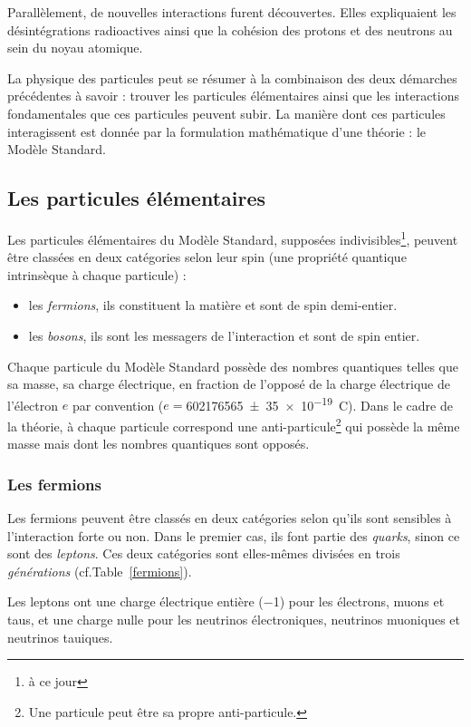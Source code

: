 \vspace*{-0.5cm}
Parallèlement, de nouvelles interactions furent découvertes. Elles expliquaient les désintégrations radioactives ainsi que la cohésion des protons et des neutrons au sein du noyau atomique.

La physique des particules peut se résumer à la combinaison des deux démarches précédentes à savoir : trouver les particules élémentaires ainsi que les interactions fondamentales que ces particules peuvent subir. La manière dont ces particules interagissent est donnée par la formulation mathématique d'une théorie : le Modèle Standard.

\subsection{Les particules élémentaires}
Les particules élémentaires du Modèle Standard, supposées indivisibles\footnote{à ce jour}, peuvent être classées en deux catégories selon leur spin (une propriété quantique intrinsèque à chaque particule) :
\begin{itemize}[label=$\bullet$]
\item les \textit{fermions}, ils constituent la matière et sont de spin demi-entier.
\item les \textit{bosons}, ils sont les messagers de l'interaction et sont de spin entier.
\end{itemize}
Chaque particule du Modèle Standard possède des nombres quantiques telles que sa masse, sa charge électrique, en fraction de l'opposé de la charge électrique de l'électron $e$ par convention ($e=$\SI{602 176 565(35)e-19}{\coulomb}). Dans le cadre de la théorie, à chaque particule correspond une anti-particule\footnote{Une particule peut être sa propre anti-particule.} qui possède la même masse mais dont les nombres quantiques sont opposés.

\subsubsection{Les fermions}
Les fermions peuvent être classés en deux catégories selon qu'ils sont sensibles à l'interaction forte ou non. Dans le premier cas, ils font partie des \textit{quarks}, sinon ce sont des \textit{leptons}. Ces deux catégories sont elles-mêmes divisées en trois \textit{générations} (cf.Table~\ref{fermions}).

Les leptons ont une charge électrique entière (\num{-1}) pour les électrons, muons et taus, et une charge nulle pour les neutrinos électroniques, neutrinos muoniques et neutrinos tauiques.


